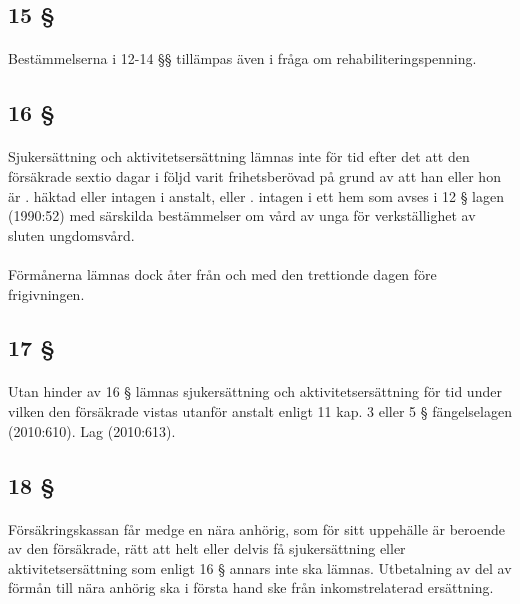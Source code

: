\documentclass[a4paper,notitlepage,openany,10pt]{book}
\begin{document}
\subsection*{15 §}
\paragraph*{}
Bestämmelserna i 12-14 §§ tillämpas även i fråga om rehabiliteringspenning.
\subsection*{16 §}
\paragraph*{}
Sjukersättning och aktivitetsersättning lämnas inte för tid efter det att den försäkrade sextio dagar i följd varit frihetsberövad på grund av att han eller hon är
. häktad eller intagen i anstalt, eller
. intagen i ett hem som avses i 12 § lagen (1990:52) med särskilda bestämmelser om vård av unga för verkställighet av sluten ungdomsvård.
\paragraph*{}
Förmånerna lämnas dock åter från och med den trettionde dagen före frigivningen.
\subsection*{17 §}
\paragraph*{}
Utan hinder av 16 § lämnas sjukersättning och aktivitetsersättning för tid under vilken den försäkrade vistas utanför anstalt enligt 11 kap. 3 eller 5 § fängelselagen (2010:610).
Lag (2010:613).
\subsection*{18 §}
\paragraph*{}
Försäkringskassan får medge en nära anhörig, som för sitt uppehälle är beroende av den försäkrade, rätt att helt eller delvis få sjukersättning eller aktivitetsersättning som enligt 16 § annars inte ska lämnas. Utbetalning av del av förmån till nära anhörig ska i första hand ske från inkomstrelaterad ersättning.
\end{document}
